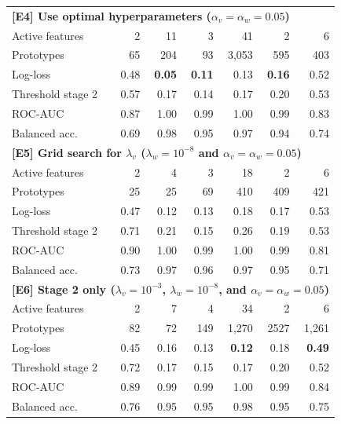 \begin{table}
\begin{center}
\begin{tabular}{|lrrrrrr|}
\multicolumn{7}{|l|}{\textbf{[E4] Use optimal hyperparameters ($\alpha_v=\alpha_w=0.05$)}}\\
Active features&2&11&3&41&2&6\\
Prototypes&65&204&93&3,053&595&403\\
Log-loss&0.48&\textbf{0.05}&\textbf{0.11}&0.13&\textbf{0.16}&0.52\\
Threshold stage 2&0.57&0.17&0.14&0.17&0.20&0.53\\
ROC-AUC&0.87&1.00&0.99&1.00&0.99&0.83\\
Balanced acc.&0.69&0.98&0.95&0.97&0.94&0.74\\
\multicolumn{7}{|l|}{\textbf{[E5] Grid search for $\lambda_v$ ($\lambda_w=10^{-8}$ and $\alpha_v=\alpha_w=0.05$)}}\\
Active features&2&4&3&18&2&6\\
Prototypes&25&25&69&410&409&421\\
Log-loss&0.47&0.12&0.13&0.18&0.17&0.53\\
Threshold stage 2&0.71&0.21&0.15&0.26&0.19&0.53\\
ROC-AUC&0.90&1.00&0.99&1.00&0.99&0.81\\
Balanced acc.&0.73&0.97&0.96&0.97&0.95&0.71\\
\multicolumn{7}{|l|}{\textbf{[E6] Stage 2 only  ($\lambda_v=10^{-3}$, $\lambda_w=10^{-8}$, and $\alpha_v=\alpha_w=0.05$)}}\\
Active features&2&7&4&34&2&6\\
Prototypes&82&72&149&1,270&2527&1,261\\
Log-loss&0.45&0.16&0.13&\textbf{0.12}&0.18&\textbf{0.49}\\
Threshold stage 2&0.72&0.17&0.15&0.17&0.20&0.52\\
ROC-AUC&0.89&0.99&0.99&1.00&0.99&0.84\\
Balanced acc.&0.76&0.95&0.95&0.98&0.95&0.75\\
\hline
\end{tabular}
\end{center}
\end{table}
%
\clearpage
%
